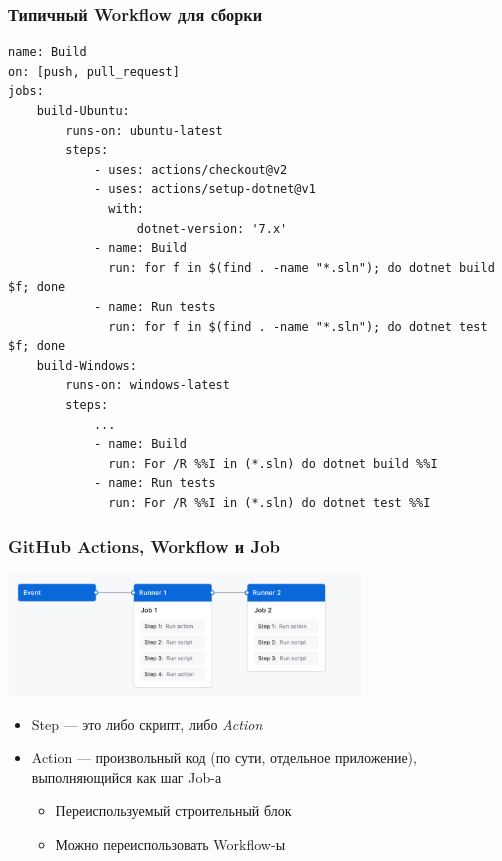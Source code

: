 \documentclass{../../slides-style}
\begin{document}
    \begin{frame}[fragile]
        \frametitle{Типичный Workflow для сборки}
        \begin{scriptsize}
            \begin{verbatim}
name: Build
on: [push, pull_request]
jobs:
    build-Ubuntu:
        runs-on: ubuntu-latest
        steps:
            - uses: actions/checkout@v2
            - uses: actions/setup-dotnet@v1
              with:
                  dotnet-version: '7.x'
            - name: Build
              run: for f in $(find . -name "*.sln"); do dotnet build $f; done
            - name: Run tests
              run: for f in $(find . -name "*.sln"); do dotnet test $f; done
    build-Windows:
        runs-on: windows-latest
        steps:
            ...
            - name: Build
              run: For /R %%I in (*.sln) do dotnet build %%I
            - name: Run tests
              run: For /R %%I in (*.sln) do dotnet test %%I
            \end{verbatim}
        \end{scriptsize}
    \end{frame}

    \begin{frame}
        \frametitle{GitHub Actions, Workflow и Job}
        \begin{center}
            \includegraphics[width=0.7\textwidth]{githubActionsWorkflow.png}
        \end{center}
        \begin{itemize}
            \item Step --- это либо скрипт, либо \emph{Action}
            \item Action --- произвольный код (по сути, отдельное приложение), выполняющийся как шаг Job-а
            \begin{itemize}
                \item Переиспользуемый строительный блок
                \item Можно переиспользовать Workflow-ы
            \end{itemize}
        \end{itemize}
    \end{frame}
\end{document}
